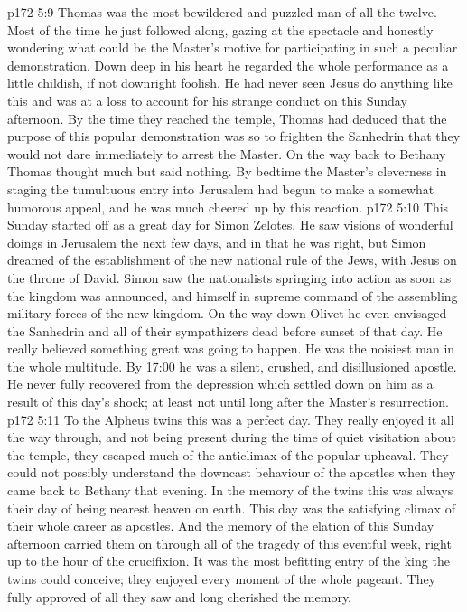 \vs p172 5:9 \pc Thomas was the most bewildered and puzzled man of all the twelve. Most of the time he just followed along, gazing at the spectacle and honestly wondering what could be the Master’s motive for participating in such a peculiar demonstration. Down deep in his heart he regarded the whole performance as a little childish, if not downright foolish. He had never seen Jesus do anything like this and was at a loss to account for his strange conduct on this Sunday afternoon. By the time they reached the temple, Thomas had deduced that the purpose of this popular demonstration was so to frighten the Sanhedrin that they would not dare immediately to arrest the Master. On the way back to Bethany Thomas thought much but said nothing. By bedtime the Master’s cleverness in staging the tumultuous entry into Jerusalem had begun to make a somewhat humorous appeal, and he was much cheered up by this reaction.
\vs p172 5:10 This Sunday started off as a great day for Simon Zelotes. He saw visions of wonderful doings in Jerusalem the next few days, and in that he was right, but Simon dreamed of the establishment of the new national rule of the Jews, with Jesus on the throne of David. Simon saw the nationalists springing into action as soon as the kingdom was announced, and himself in supreme command of the assembling military forces of the new kingdom. On the way down Olivet he even envisaged the Sanhedrin and all of their sympathizers dead before sunset of that day. He really believed something great was going to happen. He was the noisiest man in the whole multitude. By 17:00 he was a silent, crushed, and disillusioned apostle. He never fully recovered from the depression which settled down on him as a result of this day’s shock; at least not until long after the Master’s resurrection.
\vs p172 5:11 To the Alpheus twins this was a perfect day. They really enjoyed it all the way through, and not being present during the time of quiet visitation about the temple, they escaped much of the anticlimax of the popular upheaval. They could not possibly understand the downcast behaviour of the apostles when they came back to Bethany that evening. In the memory of the twins this was always their day of being nearest heaven on earth. This day was the satisfying climax of their whole career as apostles. And the memory of the elation of this Sunday afternoon carried them on through all of the tragedy of this eventful week, right up to the hour of the crucifixion. It was the most befitting entry of the king the twins could conceive; they enjoyed every moment of the whole pageant. They fully approved of all they saw and long cherished the memory.
